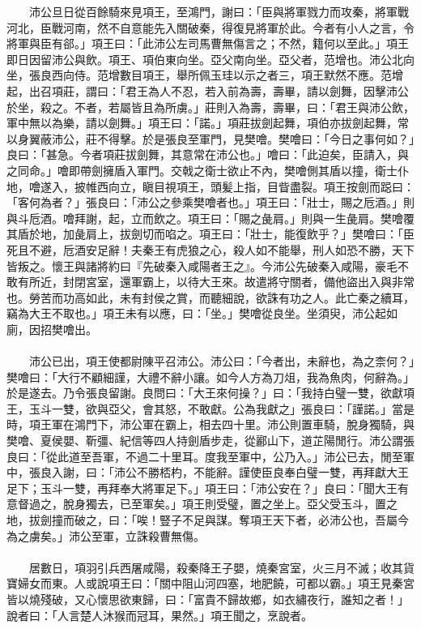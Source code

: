 　　沛公旦日從百餘騎來見項王，至鴻門，謝曰：「臣與將軍戮力而攻秦，將軍戰河北，臣戰河南，然不自意能先入關破秦，得復見將軍於此。今者有小人之言，令將軍與臣有郤。」項王曰：「此沛公左司馬曹無傷言之；不然，籍何以至此。」項王即日因留沛公與飲。項王、項伯東向坐。亞父南向坐。亞父者，范增也。沛公北向坐，張良西向侍。范增數目項王，舉所佩玉珪以示之者三，項王默然不應。范增起，出召項莊，謂曰：「君王為人不忍，若入前為壽，壽畢，請以劍舞，因擊沛公於坐，殺之。不者，若屬皆且為所虜。」莊則入為壽，壽畢，曰：「君王與沛公飲，軍中無以為樂，請以劍舞。」項王曰：「諾。」項莊拔劍起舞，項伯亦拔劍起舞，常以身翼蔽沛公，莊不得擊。於是張良至軍門，見樊噲。樊噲曰：「今日之事何如？」良曰：「甚急。今者項莊拔劍舞，其意常在沛公也。」噲曰：「此迫矣，臣請入，與之同命。」噲即帶劍擁盾入軍門。交戟之衛士欲止不內，樊噲側其盾以撞，衛士仆地，噲遂入，披帷西向立，瞋目視項王，頭髪上指，目眥盡裂。項王按劍而跽曰：「客何為者？」張良曰：「沛公之參乘樊噲者也。」項王曰：「壯士，賜之卮酒。」則與斗卮酒。噲拜謝，起，立而飲之。項王曰：「賜之彘肩。」則與一生彘肩。樊噲覆其盾於地，加彘肩上，拔劍切而啗之。項王曰：「壯士，能復飲乎？」樊噲曰：「臣死且不避，卮酒安足辭！夫秦王有虎狼之心，殺人如不能舉，刑人如恐不勝，天下皆叛之。懷王與諸將約曰『先破秦入咸陽者王之』。今沛公先破秦入咸陽，豪毛不敢有所近，封閉宮室，還軍霸上，以待大王來。故遣將守關者，備他盜出入與非常也。勞苦而功高如此，未有封侯之賞，而聽細說，欲誅有功之人。此亡秦之續耳，竊為大王不取也。」項王未有以應，曰：「坐。」樊噲從良坐。坐須臾，沛公起如廁，因招樊噲出。
\\\\
　　沛公已出，項王使都尉陳平召沛公。沛公曰：「今者出，未辭也，為之柰何？」樊噲曰：「大行不顧細謹，大禮不辭小讓。如今人方為刀俎，我為魚肉，何辭為。」於是遂去。乃令張良留謝。良問曰：「大王來何操？」曰：「我持白璧一雙，欲獻項王，玉斗一雙，欲與亞父，會其怒，不敢獻。公為我獻之」張良曰：「謹諾。」當是時，項王軍在鴻門下，沛公軍在霸上，相去四十里。沛公則置車騎，脫身獨騎，與樊噲、夏侯嬰、靳彊、紀信等四人持劍盾步走，從酈山下，道芷陽閒行。沛公謂張良曰：「從此道至吾軍，不過二十里耳。度我至軍中，公乃入。」沛公已去，閒至軍中，張良入謝，曰：「沛公不勝桮杓，不能辭。謹使臣良奉白璧一雙，再拜獻大王足下；玉斗一雙，再拜奉大將軍足下。」項王曰：「沛公安在？」良曰：「聞大王有意督過之，脫身獨去，已至軍矣。」項王則受璧，置之坐上。亞父受玉斗，置之地，拔劍撞而破之，曰：「唉！豎子不足與謀。奪項王天下者，必沛公也，吾屬今為之虜矣。」沛公至軍，立誅殺曹無傷。
\\\\
　　居數日，項羽引兵西屠咸陽，殺秦降王子嬰，燒秦宮室，火三月不滅；收其貨寶婦女而東。人或說項王曰：「關中阻山河四塞，地肥饒，可都以霸。」項王見秦宮皆以燒殘破，又心懷思欲東歸，曰：「富貴不歸故鄉，如衣繡夜行，誰知之者！」說者曰：「人言楚人沐猴而冠耳，果然。」項王聞之，烹說者。
